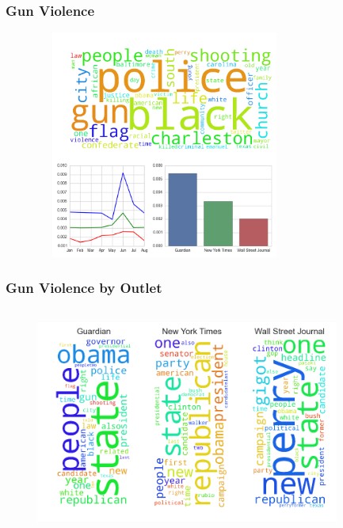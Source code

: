 \documentclass[11pt]{beamer}
\begin{document}

\begin{frame}
\frametitle{Gun Violence}

\begin{figure}
\centering
\includegraphics[width=85mm,height=75mm]{figures/source_topic1.png}
\end{figure} 

\end{frame}


\begin{frame}
\frametitle{Gun Violence by Outlet}

\begin{figure}
\centering
\includegraphics[width=100mm,height=75mm]{figures/source_within_topic1.png}
\end{figure} 

\end{frame}

\end{document}
